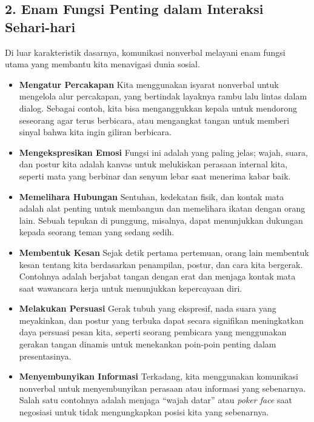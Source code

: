 \documentclass[
  letterpaper,
  DIV=11,
  numbers=noendperiod]{scrreprt}
\begin{document}
\subsection{2. Enam Fungsi Penting dalam Interaksi
Sehari-hari}\label{enam-fungsi-penting-dalam-interaksi-sehari-hari-1}

Di luar karakteristik dasarnya, komunikasi nonverbal melayani enam
fungsi utama yang membantu kita menavigasi dunia sosial.

\begin{itemize}
\item
  \textbf{Mengatur Percakapan} Kita menggunakan isyarat nonverbal untuk
  mengelola alur percakapan, yang bertindak layaknya rambu lalu lintas
  dalam dialog. Sebagai contoh, kita bisa menganggukkan kepala untuk
  mendorong seseorang agar terus berbicara, atau mengangkat tangan untuk
  memberi sinyal bahwa kita ingin giliran berbicara.
\item
  \textbf{Mengekspresikan Emosi} Fungsi ini adalah yang paling jelas;
  wajah, suara, dan postur kita adalah kanvas untuk melukiskan perasaan
  internal kita, seperti mata yang berbinar dan senyum lebar saat
  menerima kabar baik.
\item
  \textbf{Memelihara Hubungan} Sentuhan, kedekatan fisik, dan kontak
  mata adalah alat penting untuk membangun dan memelihara ikatan dengan
  orang lain. Sebuah tepukan di punggung, misalnya, dapat menunjukkan
  dukungan kepada seorang teman yang sedang sedih.
\item
  \textbf{Membentuk Kesan} Sejak detik pertama pertemuan, orang lain
  membentuk kesan tentang kita berdasarkan penampilan, postur, dan cara
  kita bergerak. Contohnya adalah berjabat tangan dengan erat dan
  menjaga kontak mata saat wawancara kerja untuk menunjukkan kepercayaan
  diri.
\item
  \textbf{Melakukan Persuasi} Gerak tubuh yang ekspresif, nada suara
  yang meyakinkan, dan postur yang terbuka dapat secara signifikan
  meningkatkan daya persuasi pesan kita, seperti seorang pembicara yang
  menggunakan gerakan tangan dinamis untuk menekankan poin-poin penting
  dalam presentasinya.
\item
  \textbf{Menyembunyikan Informasi} Terkadang, kita menggunakan
  komunikasi nonverbal untuk menyembunyikan perasaan atau informasi yang
  sebenarnya. Salah satu contohnya adalah menjaga ``wajah datar'' atau
  \emph{poker face} saat negosiasi untuk tidak mengungkapkan posisi kita
  yang sebenarnya.
\end{itemize}
\end{document}
